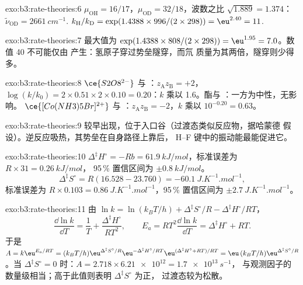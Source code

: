 \begin{solution}{exo:b3:rate-theories:6}
$\mu_{\mathrm{OH}} = 16/17$，$\mu_{\mathrm{OD}} = 32/18$，波数之比 $\sqrt{1.889} = 1.374$：
$\tilde\nu_{\mathrm{OD}} = \qty{2661}{cm^{-1}}$. $k_{\mathrm H}/k_{\mathrm D} = \exp(1.4388 \times 996/(2 \times 298)) = \eu^{2.40} = 11$.
\end{solution}

\begin{solution}{exo:b3:rate-theories:7}
最大值为 $\exp(1.4388 \times 808/(2 \times 298)) = \eu^{1.95} = 7.0$。数值 40 不可能仅由
产生：氢原子穿过势垒隧穿，而氘
质量为其两倍，隧穿则少得多。
\end{solution}

\begin{solution}{exo:b3:rate-theories:8}
$\ce{S2O8^{2-}}$ 与 ：$z_{\mathrm A}z_{\mathrm B} = +2$，$\log(k/k_0) = 2 \times 0.51 \times 2 \times 0.10 = 0.20$：$k$
乘以 1.6。酯与 ：一方为中性，无影响。
$\ce{[Co(NH3)5Br]^{2+}}$ 与 ：$z_{\mathrm A}z_{\mathrm B} = -2$，$k$ 乘以 $10^{-0.20} = 0.63$。
\end{solution}

\begin{solution}{exo:b3:rate-theories:9}
较早出现，位于入口谷（过渡态类似反应物，据哈蒙德
假设）。逆反应吸热，其势垒在自身路径上靠后，
H--F 键中的振动能最能促进它。
\end{solution}

\begin{solution}{exo:b3:rate-theories:10}
$\Delta^{\ddagger}H^\circ = -Rb = \qty{61.9}{kJ/mol}$，标准误差为 $R \times 31 = \qty{0.26}{kJ/mol}$，
95\,\% 置信区间为 $\pm\qty{0.8}{kJ/mol}$。
\[
  \Delta^{\ddagger}S^\circ = R(16.528 - 23.760) = \qty{-60.1}{J.K^{-1}.mol^{-1}},
\]
标准误差为 $R \times 0.103 = \qty{0.86}{J.K^{-1}.mol^{-1}}$，95\,\% 置信区间为 $\pm\qty{2.7}{J.K^{-1}.mol^{-1}}$。
\end{solution}

\begin{solution}{exo:b3:rate-theories:11}
由 $\ln k = \ln(k_BT/h) + \Delta^{\ddagger}S^\circ/R - \Delta^{\ddagger}H^\circ/RT$，
\[
  \frac{\dd\ln k}{\dd T} = \frac1T + \frac{\Delta^{\ddagger}H^\circ}{RT^2}, \qquad
  E_a = RT^2\frac{\dd\ln k}{\dd T} = \Delta^{\ddagger}H^\circ + RT .
\] 于是 $A = k\eu^{E_a/RT} = (k_BT/h)\eu^{\Delta^{\ddagger}S^\circ/R}\eu^{-\Delta^{\ddagger}H^\circ/RT}\eu^{(\Delta^{\ddagger}H^\circ + RT)/RT} =
\eu\,(k_BT/h)\eu^{\Delta^{\ddagger}S^\circ/R}$。当 $\Delta^{\ddagger}S^\circ = 0$ 时：$A = 2.718 \times \num{6.21e12} = \qty{1.7e13}{s^{-1}}$，
与观测因子的数量级相当；高于此值则表明 $\Delta^{\ddagger}S^\circ$ 为正，
过渡态较为松散。
\end{solution}

